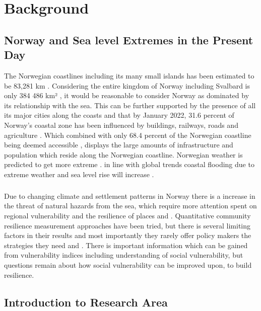 \chapter{Background}

\section{Norway and Sea level Extremes in the Present Day}
The Norwegian coastlines including its many small islands has been estimated to be 83,281 km \cite{aunan_strong_2008}. Considering the entire kingdom of Norway including Svalbard is only 384 486 km² \cite{engelien_area_2022}, it would be reasonable to consider Norway as dominated by its relationship with the sea. This can be further supported by the presence of all its major cities along the coasts and that by January 2022, 31.6 percent of Norway's coastal zone has been influenced by buildings, railways, roads and agriculture \cite{engebakken_construction_2022}. Which combined with only 68.4 percent of the Norwegian coastline being deemed accessible \cite{engebakken_construction_2022}, displays the large amounts of infrastructure and population which reside along the Norwegian coastline. Norwegian weather is predicted to get more extreme \cite{rod_integrated_2012}. in line with global trends coastal flooding due to extreme weather and sea level rise will increase \cite{hoffken_effects_2020}. 
\paragraph{}

Due to changing climate and settlement patterns in Norway there is a increase in the threat of natural hazards from the sea, which require more attention spent on regional vulnerability and the resilience of places \cite{opach_seeking_2020} and \cite{rod_three_2015} . Quantitative community resilience measurement approaches have been tried, but there is several limiting factors in their results and most importantly they rarely offer policy makers the strategies they need \cite{opach_seeking_2020} and \cite{gerkensmeier_governing_2018}. There is important information which can be gained from vulnerability indices including understanding of social vulnerability, but questions remain about how social vulnerability can be improved upon, to build resilience. 


\section{Introduction to Research Area}

